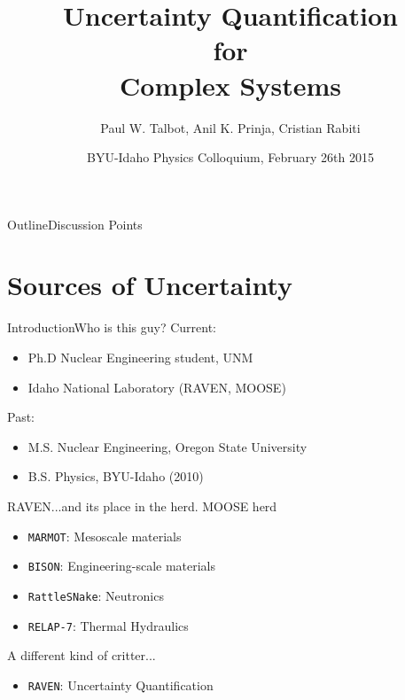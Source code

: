 \documentclass{beamer}
\title[Numerical UQ Methods] %
{Uncertainty Quantification\\ for\\ Complex Systems}
\author[Talbot] %
{Paul W. Talbot\inst{1}, Anil K. Prinja\inst{1}, Cristian Rabiti\inst{2}}
\institute[University of New Mexico] %
{
  \inst{1}%
  University of New Mexico\\
  \inst{2}
  Idaho National Laboratory
}
\date[BYU-I, 2014] %
{BYU-Idaho Physics Colloquium, February 26th 2015}
\begin{document}
\begin{frame}
  \titlepage
\end{frame}

\begin{frame}{Outline}{Discussion Points}\vspace{-20pt}
  \tableofcontents%
\end{frame}

\section{Sources of Uncertainty}
\begin{frame}{Introduction}{Who is this guy?}\vspace{-30pt}
Current: 
\begin{itemize}
\item  Ph.D Nuclear Engineering student, UNM
\item  Idaho National Laboratory (RAVEN, MOOSE)
\end{itemize}
Past: 
\begin{itemize}
\item M.S. Nuclear Engineering, Oregon State University
\item B.S. Physics, BYU-Idaho (2010)
\end{itemize}
\end{frame}

\begin{frame}{RAVEN}{...and its place in the herd.}\vspace{-20pt}
MOOSE herd
\begin{itemize}
\item \texttt{MARMOT}: Mesoscale materials
\item \texttt{BISON}: Engineering-scale materials
\item \texttt{RattleSNake}: Neutronics
\item \texttt{RELAP-7}: Thermal Hydraulics
\end{itemize}\vspace{10pt}
A different kind of critter...
\begin{itemize}
\item \texttt{RAVEN}: Uncertainty Quantification
\end{itemize}
\end{frame}
\end{document}

